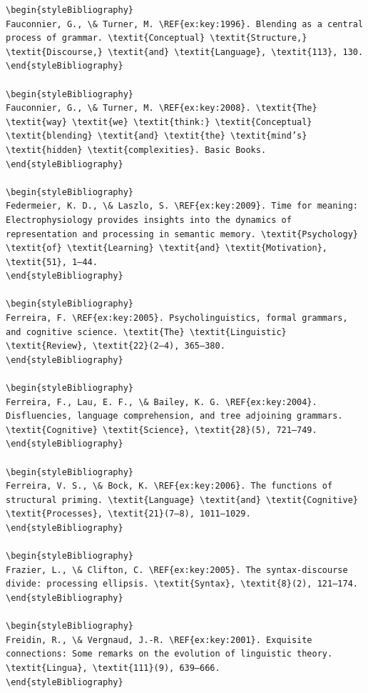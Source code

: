 \begin{verbatim}
\begin{styleBibliography}
Fauconnier, G., \& Turner, M. \REF{ex:key:1996}. Blending as a central process of grammar. \textit{Conceptual} \textit{Structure,} \textit{Discourse,} \textit{and} \textit{Language}, \textit{113}, 130.
\end{styleBibliography}

\begin{styleBibliography}
Fauconnier, G., \& Turner, M. \REF{ex:key:2008}. \textit{The} \textit{way} \textit{we} \textit{think:} \textit{Conceptual} \textit{blending} \textit{and} \textit{the} \textit{mind’s} \textit{hidden} \textit{complexities}. Basic Books.
\end{styleBibliography}

\begin{styleBibliography}
Federmeier, K. D., \& Laszlo, S. \REF{ex:key:2009}. Time for meaning: Electrophysiology provides insights into the dynamics of representation and processing in semantic memory. \textit{Psychology} \textit{of} \textit{Learning} \textit{and} \textit{Motivation}, \textit{51}, 1–44.
\end{styleBibliography}

\begin{styleBibliography}
Ferreira, F. \REF{ex:key:2005}. Psycholinguistics, formal grammars, and cognitive science. \textit{The} \textit{Linguistic} \textit{Review}, \textit{22}(2–4), 365–380.
\end{styleBibliography}

\begin{styleBibliography}
Ferreira, F., Lau, E. F., \& Bailey, K. G. \REF{ex:key:2004}. Disfluencies, language comprehension, and tree adjoining grammars. \textit{Cognitive} \textit{Science}, \textit{28}(5), 721–749.
\end{styleBibliography}

\begin{styleBibliography}
Ferreira, V. S., \& Bock, K. \REF{ex:key:2006}. The functions of structural priming. \textit{Language} \textit{and} \textit{Cognitive} \textit{Processes}, \textit{21}(7–8), 1011–1029.
\end{styleBibliography}

\begin{styleBibliography}
Frazier, L., \& Clifton, C. \REF{ex:key:2005}. The syntax-discourse divide: processing ellipsis. \textit{Syntax}, \textit{8}(2), 121–174.
\end{styleBibliography}

\begin{styleBibliography}
Freidin, R., \& Vergnaud, J.-R. \REF{ex:key:2001}. Exquisite connections: Some remarks on the evolution of linguistic theory. \textit{Lingua}, \textit{111}(9), 639–666.
\end{styleBibliography}


\end{verbatim}
